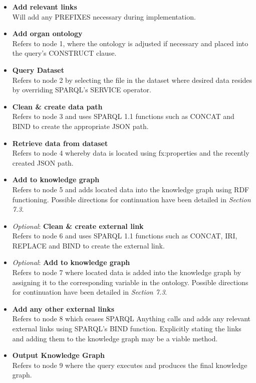 \begin{itemize}
    \item \textbf{Add relevant links} \\ Will add any PREFIXES necessary during implementation. 
    \item \textbf{Add organ ontology} \\  Refers to node 1, where the ontology is adjusted if necessary and placed into the query's CONSTRUCT clause. 
    \item \textbf{Query Dataset} \\ Refers to node 2 by selecting the file in the dataset where desired data resides by overriding SPARQL's SERVICE operator.
    \item \textbf{Clean \& create data path} \\ Refers to node 3 and uses SPARQL 1.1 functions such as CONCAT and BIND to create the appropriate JSON path. 
    \item \textbf{Retrieve data from dataset} \\ Refers to node 4 whereby data is located using fx:properties and the recently created JSON path. 
    \item \textbf{Add to knowledge graph} \\ Refers to node 5 and adds located data into the knowledge graph using RDF functioning. Possible directions for continuation have been detailed in \textit{Section 7.3}.
    \item \textit{Optional}: \textbf{Clean \& create external link} \\ Refers to node 6 and uses SPARQL 1.1 functions such as CONCAT, IRI, REPLACE and BIND to create the external link.
    \item  \textit{Optional}: \textbf{Add to knowledge graph} \\ Refers to node 7 where located data is added into the knowledge graph by assigning it to the corresponding variable in the ontology. Possible directions for continuation have been detailed in \textit{Section 7.3}.
    \item \textbf{Add any other external links} \\ Refers to node 8 which ceases SPARQL Anything calls and adds any relevant external links using SPARQL's BIND function. Explicitly stating the links and adding them to the knowledge graph may be a viable method. 
    \item \textbf{Output Knowledge Graph} \\ Refers to node 9 where the query executes and produces the final knowledge graph. 
\end{itemize}
